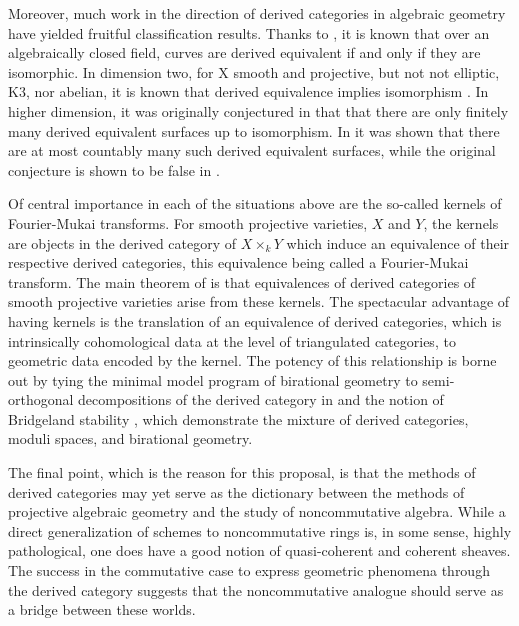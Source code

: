 \documentclass[11pt]{article}
\begin{document}
Moreover, much work in the direction of derived categories in algebraic geometry have yielded fruitful classification results.
Thanks to \cite{Orlov1997}, it is known that over an algebraically closed field, curves are derived equivalent if and only if they are isomorphic.
In dimension two, for X smooth and projective, but not not elliptic, K3, nor abelian, it is known that derived equivalence implies isomorphism \cite[Prop. 12.1]{HuyFMT}.
In higher dimension, it was originally conjectured in \cite{kawamata2002} that that there are only finitely many derived equivalent surfaces up to isomorphism.
In \cite{AnToe} it was shown that there are at most countably many such derived equivalent surfaces, while the original conjecture is shown to be false in \cite{lesieutre2014}.

Of central importance in each of the situations above are the so-called kernels of Fourier-Mukai transforms.
For smooth projective varieties, $X$ and $Y$, the kernels are objects in the derived category of $X \times_k Y$ which induce an equivalence of their respective derived categories, this equivalence being called a Fourier-Mukai transform.
The main theorem of \cite{Orlov1997} is that equivalences of derived categories of smooth projective varieties arise from these kernels.
The spectacular advantage of having kernels is the translation of an equivalence of derived categories, which is intrinsically cohomological data at the level of triangulated categories, to geometric data encoded by the kernel.
The potency of this relationship is borne out by tying the minimal model program of birational geometry to semi-orthogonal decompositions of the derived category in \cite{Bridgeland02,kawamata2002} and the notion of Bridgeland stability \cite{Bri07, ABCH13, BM14a, BM14b}, which demonstrate the mixture of derived categories, moduli spaces, and birational geometry.

The final point, which is the reason for this proposal, is that the methods of derived categories may yet serve as the dictionary between the methods of projective algebraic geometry and the study of noncommutative algebra.
While a direct generalization of schemes to noncommutative rings is, in some sense, highly pathological, one does have a good notion of quasi-coherent and coherent sheaves.
The success in the commutative case to express geometric phenomena through the derived category suggests that the noncommutative analogue should serve as a bridge between these worlds.
\end{document}
